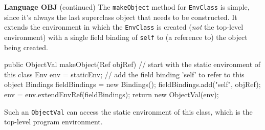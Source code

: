 \begin{minipage}[t]{\sw}
\slidenumber
\LARGE
{\bf Language OBJ} (continued)\exx
The \verb'makeObject' method for \verb'EnvClass' is simple,
since it's always the last superclass object that needs to be constructed.
It extends the environment in which the \verb'EnvClass' is created
({\em not} the top-level environment)
with a single field binding of \verb'self'
to (a reference to) the object being created.
\Large
\begin{qv}
    public ObjectVal makeObject(Ref objRef) {
        // start with the static environment of this class
        Env env = staticEnv;
        // add the field binding 'self' to refer to this object
        Bindings fieldBindings = new Bindings();
        fieldBindings.add("self", objRef);
        env = env.extendEnvRef(fieldBindings);
        return new ObjectVal(env);
    }
\end{qv}
\LARGE
Such an \verb'ObjectVal' can access the static environment
of this class, which is the top-level program environment.
\end{minipage}
